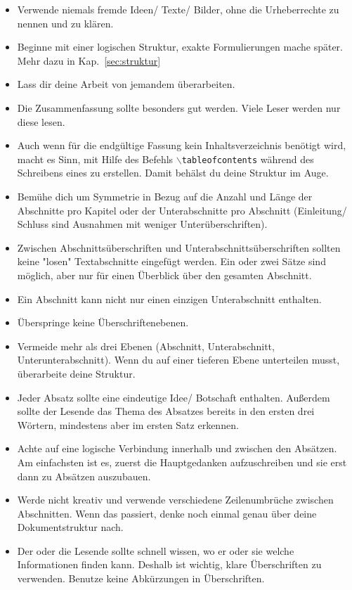 \begin{itemize}
\item  Verwende niemals fremde Ideen/ Texte/ Bilder, ohne die Urheberrechte zu nennen und zu klären. 
\item  Beginne mit einer logischen Struktur, exakte Formulierungen mache später. Mehr dazu in Kap.~\ref{sec:struktur}
\item Lass dir deine Arbeit von jemandem überarbeiten.
\item  Die Zusammenfassung sollte besonders gut werden. Viele Leser werden nur diese lesen.
\item  Auch wenn für die endgültige Fassung kein Inhaltsverzeichnis benötigt wird, macht es Sinn, mit Hilfe des Befehls 
\texttt{$\backslash$tableofcontents} während des Schreibens eines zu erstellen. Damit behälst du deine Struktur im Auge. %
\item Bemühe dich um Symmetrie in Bezug auf die Anzahl und Länge der Abschnitte pro Kapitel oder der Unterabschnitte pro Abschnitt (Einleitung/ Schluss sind Ausnahmen mit weniger Unterüberschriften). 



\item Zwischen Abschnittsüberschriften und Unterabschnittsüberschriften sollten keine "losen" Textabschnitte eingefügt werden. Ein oder zwei Sätze sind möglich, aber nur für einen Überblick über den gesamten Abschnitt.


\item Ein Abschnitt kann nicht nur einen einzigen Unterabschnitt enthalten.

\item Überspringe keine Überschriftenebenen.


\item Vermeide mehr als drei Ebenen (Abschnitt, Unterabschnitt, Unterunterabschnitt). Wenn du auf einer tieferen Ebene unterteilen musst, überarbeite deine Struktur.

\item Jeder Absatz sollte eine eindeutige Idee/ Botschaft enthalten. Außerdem sollte der Lesende das Thema des Absatzes bereits in den ersten drei Wörtern, mindestens aber im ersten Satz erkennen.

\item Achte auf eine logische Verbindung innerhalb und zwischen den Absätzen. Am einfachsten ist es, zuerst die Hauptgedanken aufzuschreiben und sie erst dann zu Absätzen auszubauen.

\item  Werde nicht kreativ und verwende verschiedene Zeilenumbrüche zwischen Abschnitten. Wenn das passiert, denke noch einmal genau über deine Dokumentstruktur nach.

\item Der oder die Lesende sollte schnell wissen, wo er oder sie welche Informationen finden kann. Deshalb ist wichtig, klare Überschriften zu verwenden. Benutze keine Abkürzungen in Überschriften.

\end{itemize}
